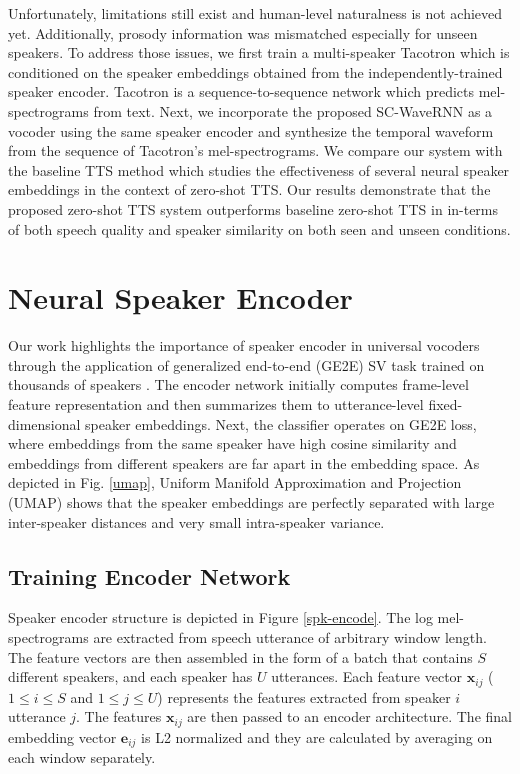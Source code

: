 \documentclass[a4paper]{article}
\begin{document}
Unfortunately, limitations still exist and human-level naturalness is not achieved yet. Additionally, prosody information was mismatched especially for unseen speakers. To address those issues, we first train a multi-speaker Tacotron which is conditioned on the speaker embeddings obtained from the independently-trained speaker encoder. Tacotron \cite{wang2017tacotron} is a sequence-to-sequence network which predicts mel-spectrograms from text. Next, we incorporate the proposed SC-WaveRNN as a vocoder using the same speaker encoder and synthesize the temporal waveform from the sequence of Tacotron's mel-spectrograms. We compare our system with the baseline TTS method \cite{cooper2019zero} which studies the effectiveness of several neural speaker embeddings in the context of zero-shot TTS. Our results demonstrate that the proposed zero-shot TTS system outperforms baseline zero-shot TTS in \cite{cooper2019zero} in-terms of both speech quality and speaker similarity on both seen and unseen conditions.



\vspace{-2mm}
\section{Neural Speaker Encoder}

Our work highlights the importance of speaker encoder in universal vocoders through the application of generalized end-to-end (GE2E) SV task trained on thousands of speakers \cite{wan2018generalized}.
The encoder network initially computes frame-level feature representation and then summarizes them to utterance-level fixed-dimensional speaker embeddings. Next, the classifier operates on GE2E loss, where embeddings from the same speaker have high cosine similarity and embeddings from different speakers are far apart in the embedding space. As depicted in Fig. \ref{umap}, Uniform Manifold Approximation and Projection (UMAP) shows that the speaker embeddings are perfectly separated with large inter-speaker distances and very small intra-speaker variance.
\vspace{-1mm}
\subsection{Training Encoder Network}
Speaker encoder structure is depicted in Figure \ref{spk-encode}. The log mel-spectrograms are extracted from speech utterance of arbitrary window length. The feature vectors are then assembled in the form of a batch that contains $S$ different speakers, and each speaker has $U$ utterances. Each feature vector $\mathbf{x}_{ij}$ ($1 \leq i \leq S$ and $1\leq j \leq U$) represents the features extracted from speaker $i$ utterance $j$. The features $\mathbf{x}_{ij}$ are then passed to an encoder architecture. The final embedding vector $\mathbf{e}_{ij}$ is L2 normalized and they are calculated by averaging on each window separately.
\end{document}
